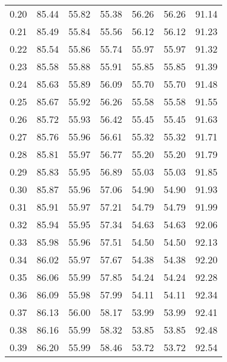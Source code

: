 \begin{tabular}{|c|c|c|c|c|c|c|}
      0.20 &     85.44 &     55.82 &      55.38 &   56.26 &      56.26 &         91.14 \\
      0.21 &     85.49 &     55.84 &      55.56 &   56.12 &      56.12 &         91.23 \\
      0.22 &     85.54 &     55.86 &      55.74 &   55.97 &      55.97 &         91.32 \\
      0.23 &     85.58 &     55.88 &      55.91 &   55.85 &      55.85 &         91.39 \\
      0.24 &     85.63 &     55.89 &      56.09 &   55.70 &      55.70 &         91.48 \\
      0.25 &     85.67 &     55.92 &      56.26 &   55.58 &      55.58 &         91.55 \\
      0.26 &     85.72 &     55.93 &      56.42 &   55.45 &      55.45 &         91.63 \\
      0.27 &     85.76 &     55.96 &      56.61 &   55.32 &      55.32 &         91.71 \\
      0.28 &     85.81 &     55.97 &      56.77 &   55.20 &      55.20 &         91.79 \\
      0.29 &     85.83 &     55.95 &      56.89 &   55.03 &      55.03 &         91.85 \\
      0.30 &     85.87 &     55.96 &      57.06 &   54.90 &      54.90 &         91.93 \\
      0.31 &     85.91 &     55.97 &      57.21 &   54.79 &      54.79 &         91.99 \\
      0.32 &     85.94 &     55.95 &      57.34 &   54.63 &      54.63 &         92.06 \\
      0.33 &     85.98 &     55.96 &      57.51 &   54.50 &      54.50 &         92.13 \\
      0.34 &     86.02 &     55.97 &      57.67 &   54.38 &      54.38 &         92.20 \\
      0.35 &     86.06 &     55.99 &      57.85 &   54.24 &      54.24 &         92.28 \\
      0.36 &     86.09 &     55.98 &      57.99 &   54.11 &      54.11 &         92.34 \\
      0.37 &     86.13 &     56.00 &      58.17 &   53.99 &      53.99 &         92.41 \\
      0.38 &     86.16 &     55.99 &      58.32 &   53.85 &      53.85 &         92.48 \\
      0.39 &     86.20 &     55.99 &      58.46 &   53.72 &      53.72 &         92.54 \\

\end{tabular}
